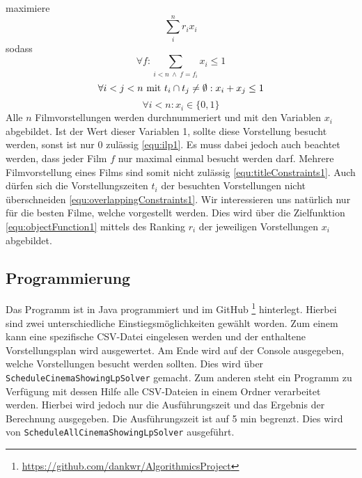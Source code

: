 \documentclass[a4paper, 12pt]{article}
\begin{document}
 maximiere 
\begin{equation} \label{equ:objectFunction1}
    \sum_i^n r_i x_i
\end{equation}
 sodass 
\begin{equation} \label{equ:titleConstraints1}
    \forall f: \sum\limits_{i < n \> \land \> f = f_i} x_i \leq 1
\end{equation}
\begin{equation} \label{equ:overlappingConstraints1}
    \forall i < j < n \textmd{ mit  } t_i \cap t_j \neq \emptyset: x_i + x_j \leq 1
\end{equation}
\begin{equation} \label{equ:ilp1}
    \forall i < n: x_i \in \{0, 1\}
\end{equation}
Alle $n$ Filmvorstellungen werden durchnummeriert und mit den Variablen $x_i$ abgebildet.
Ist der Wert dieser Variablen 1, sollte diese Vorstellung besucht werden, sonst ist nur 0 zulässig \eqref{equ:ilp1}.
Es muss dabei jedoch auch beachtet werden, dass jeder Film $f$ nur maximal einmal besucht werden darf.
Mehrere Filmvorstellung eines Films sind somit nicht zulässig \eqref{equ:titleConstraints1}.
Auch dürfen sich die Vorstellungszeiten $t_i$ der besuchten Vorstellungen nicht überschneiden \eqref{equ:overlappingConstraints1}.
Wir interessieren uns natürlich nur für die besten Filme, welche vorgestellt werden.
Dies wird über die Zielfunktion \eqref{equ:objectFunction1} mittels des Ranking $r_i$ der jeweiligen Vorstellungen $x_i$ abgebildet.

\subsection{Programmierung}

Das Programm ist in Java programmiert und im GitHub \footnote{\url{https://github.com/dankwr/AlgorithmicsProject}} hinterlegt.
Hierbei sind zwei unterschiedliche Einstiegsmöglichkeiten gewählt worden. 
Zum einem kann eine spezifische CSV-Datei eingelesen werden und der enthaltene Vorstellungsplan wird ausgewertet.
Am Ende wird auf der Console ausgegeben, welche Vorstellungen besucht werden sollten. 
Dies wird über \texttt{ScheduleCinemaShowingLpSolver} gemacht.
Zum anderen steht ein Programm zu Verfügung mit dessen Hilfe alle CSV-Dateien in einem Ordner verarbeitet werden.
Hierbei wird jedoch nur die Ausführungszeit und das Ergebnis der Berechnung ausgegeben.
Die Ausführungszeit ist auf 5 min begrenzt.
Dies wird von  \texttt{ScheduleAllCinemaShowingLpSolver} ausgeführt.
\end{document}
